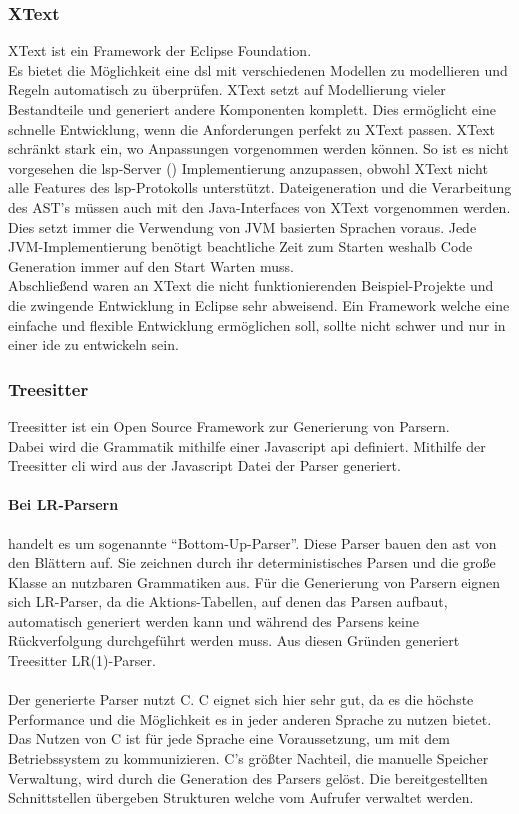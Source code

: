\documentclass[./einleitung.tex]{subfiles}
\begin{document}
\subsubsection{XText}
XText ist ein Framework der Eclipse Foundation.\\
Es bietet die Möglichkeit eine \acrfull{dsl} mit verschiedenen Modellen zu modellieren und Regeln automatisch zu überprüfen.
XText setzt auf Modellierung vieler Bestandteile und generiert andere Komponenten komplett.
Dies ermöglicht eine schnelle Entwicklung, wenn die Anforderungen perfekt zu XText passen.
XText schränkt stark ein, wo Anpassungen vorgenommen werden können.
So ist es nicht vorgesehen die \acrshort{lsp}-Server () Implementierung anzupassen, obwohl XText nicht alle Features des \acrlong{lsp}-Protokolls unterstützt.
Dateigeneration und die Verarbeitung des AST's müssen auch mit den Java-Interfaces von XText vorgenommen werden.
Dies setzt immer die Verwendung von JVM basierten Sprachen voraus.
Jede JVM-Implementierung benötigt beachtliche Zeit zum Starten weshalb Code Generation immer auf den Start Warten muss. \\
Abschließend waren an XText die nicht funktionierenden Beispiel-Projekte und die zwingende Entwicklung in Eclipse sehr abweisend.
Ein Framework welche eine einfache und flexible Entwicklung ermöglichen soll, sollte nicht schwer und nur in einer \acrshort{ide} zu entwickeln sein.
\subsubsection{Treesitter}
Treesitter ist ein Open Source Framework zur Generierung von Parsern.\\
Dabei wird die Grammatik mithilfe einer Javascript \acrlong{api} definiert.
Mithilfe der Treesitter \acrlong{cli} wird aus der Javascript Datei der Parser generiert. \\

\paragraph[LR-Parsern]{Bei LR-Parsern}\label{par:lr-parser} handelt es um sogenannte ``Bottom-Up-Parser''.
Diese Parser bauen den \acrshort{ast} von den Blättern auf.
Sie zeichnen durch ihr deterministisches Parsen und die große Klasse an nutzbaren Grammatiken aus.\newline
Für die Generierung von Parsern eignen sich LR-Parser, da die Aktions-Tabellen, auf denen das Parsen aufbaut, automatisch generiert werden kann und während des Parsens keine Rückverfolgung durchgeführt werden muss. \cite{aho1974lr}
Aus diesen Gründen generiert Treesitter LR(1)-Parser.
\\\\
Der generierte Parser nutzt C.
C eignet sich hier sehr gut, da es die höchste Performance und die Möglichkeit es in jeder anderen Sprache zu nutzen bietet.
Das Nutzen von C ist für jede Sprache eine Voraussetzung, um mit dem Betriebssystem zu kommunizieren.
C's größter Nachteil, die manuelle Speicher Verwaltung, wird durch die Generation des Parsers gelöst.
Die bereitgestellten Schnittstellen übergeben Strukturen welche vom Aufrufer verwaltet werden.
\end{document}
